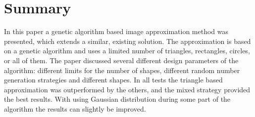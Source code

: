 \documentclass[conference]{IEEEtran}
\begin{document}
\section{Summary}

In this paper a genetic algorithm based image approximation method was
presented, which extends a similar, existing solution. The approximation
is based on a genetic algorithm and uses a limited number of triangles,
rectangles, circles, or all of them. The paper discussed several different
design parameters of the algorithm: different limits for the number of
shapes, different random number generation strategies and different shapes.
In all tests the triangle based approximation was outperformed by the others,
and the mixed strategy provided the best results. With using Gaussian distribution
during some part of the algorithm the results can slightly be improved.



\end{document}
